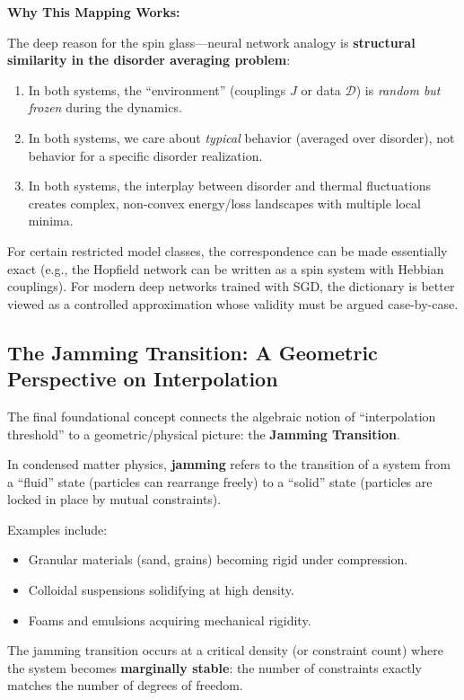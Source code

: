 \documentclass[
  journal=largetwo,
  year=2025,
  volume=37,
]{cup-journal}
\begin{document}
\textbf{Why This Mapping Works:}

The deep reason for the spin glass---neural network analogy is \textbf{structural similarity in the disorder averaging problem}:
\begin{enumerate}
    \item In both systems, the ``environment'' (couplings $J$ or data $\mathcal{D}$) is \textit{random but frozen} during the dynamics.
    \item In both systems, we care about \textit{typical} behavior (averaged over disorder), not behavior for a specific disorder realization.
    \item In both systems, the interplay between disorder and thermal fluctuations creates complex, non-convex energy/loss landscapes with multiple local minima.
\end{enumerate}

For certain restricted model classes, the correspondence can be made essentially exact (e.g., the Hopfield network can be written as a spin system with Hebbian couplings). For modern deep networks trained with SGD, the dictionary is better viewed as a controlled approximation whose validity must be argued case-by-case.

\subsection{The Jamming Transition: A Geometric Perspective on Interpolation}

The final foundational concept connects the algebraic notion of ``interpolation threshold'' to a geometric/physical picture: the \textbf{Jamming Transition}.

\begin{definition}\label{def:jamming_physics}
In condensed matter physics, \textbf{jamming} refers to the transition of a system from a ``fluid'' state (particles can rearrange freely) to a ``solid'' state (particles are locked in place by mutual constraints).

Examples include:
\begin{itemize}
    \item Granular materials (sand, grains) becoming rigid under compression.
    \item Colloidal suspensions solidifying at high density.
    \item Foams and emulsions acquiring mechanical rigidity.
\end{itemize}

The jamming transition occurs at a critical density (or constraint count) where the system becomes \textbf{marginally stable}: the number of constraints exactly matches the number of degrees of freedom.
\end{definition}
\end{document}
